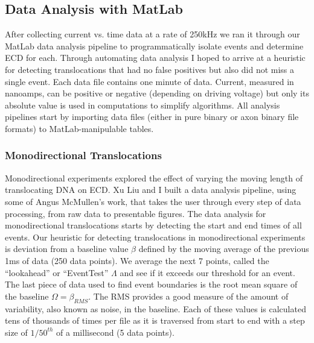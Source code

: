 \documentclass[aps,prl,preprint,groupedaddress]{revtex4}
\begin{document}
\subsection{Data Analysis with MatLab}

After collecting current vs. time data at a rate of 250kHz we ran it through our MatLab data analysis pipeline to programmatically isolate events and determine ECD for each.
Through automating data analysis I hoped to arrive at a heuristic for detecting translocations that had no false positives but also did not miss a single event.
Each data file contains one minute of data.
Current, measured in nanoamps, can be positive or negative (depending on driving voltage) but only its absolute value is used in computations to simplify algorithms.
All analysis pipelines start by importing data files (either in pure binary or axon binary file formats) to MatLab-manipulable tables.

\subsubsection{Monodirectional Translocations}

Monodirectional experiments explored the effect of varying the moving length of translocating DNA on ECD.
Xu Liu and I built a data analysis pipeline, using some of Angus McMullen's work, that takes the user through every step of data processing, from raw data to presentable figures.
The data analysis for monodirectional translocations starts by detecting the start and end times of all events.
Our heuristic for detecting translocations in monodirectional experiments is deviation from a baseline value \(\beta\) defined by the moving average of the previous 1ms of data (250 data points).
We average the next 7 points, called the ``lookahead'' or ``EventTest'' \(\Lambda\) and see if it exceeds our threshold for an event.
The last piece of data used to find event boundaries is the root mean square of the baseline \(\Omega = \beta_{RMS}\).
The RMS provides a good measure of the amount of variability, also known as noise, in the baseline.
Each of these values is calculated tens of thousands of times per file as it is traversed from start to end with a step size of \(1/50^{th}\) of a millisecond (5 data points).
\end{document}
